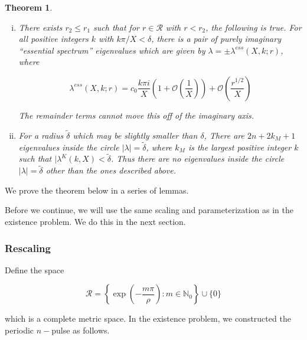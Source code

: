 \documentclass[12pt]{article}
\def\N{{\mathbb N}}
\newtheorem{theorem}{Theorem}
\begin{document}
\begin{theorem}
\begin{enumerate}[(i)]
where $n_{\text{even}}$ is the number of even $m_k$ (excluding $m_j$) and $n_{\text{odd}}$ is the number of odd $m_k$ (excluding $m_j$).

\item There exists $r_2 \leq r_1$ such that for $r \in \mathcal{R}$ with $r < r_2$, the following is true. For all positive integers $k$ with $k \pi / X < \delta$, there is a pair of purely imaginary ``essential spectrum'' eigenvalues which are given by $\lambda = \pm \lambda^{ess}(X,k; r)$, where

\begin{equation}\label{lambdaess}
\lambda^{ess}(X, k; r) = c_0 \frac{k \pi i }{X} \left( 1 + \mathcal{O}\left( \frac{1}{X} \right)\right) + \mathcal{O}\left( \frac{r^{1/2}}{X} \right)
\end{equation}

The remainder terms cannot move this off of the imaginary axis.

\item For a radius $\tilde{\delta}$ which may be slightly smaller than $\delta$, There are $2n + 2 k_M + 1$ eigenvalues inside the circle $|\lambda| = \tilde{\delta}$, where $k_M$ is the largest positive integer $k$ such that $|\lambda^K(k,X) < \tilde{\delta}$. Thus there are no eigenvalues inside the circle $|\lambda| = \tilde{\delta}$ other than the ones described above.
\end{enumerate}

\end{theorem}

We prove the theorem below in a series of lemmas. 

Before we continue, we will use the same scaling and parameterization as in the existence problem. We do this in the next section.

\subsubsection{Rescaling}

Define the space

\begin{equation}\label{setR}
\mathcal{R} = \left\{ \exp\left(-\frac{m \pi}{\rho}\right) : m \in \N_0 \right\} \cup \{ 0 \}
\end{equation}

which is a complete metric space. In the existence problem, we constructed the periodic $n-$pulse as follows. 
\end{document}
